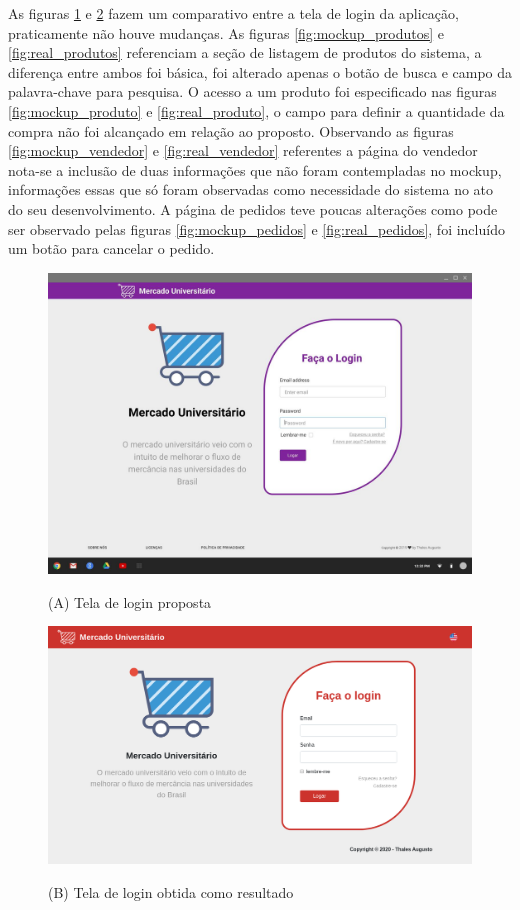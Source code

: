 As figuras \ref{fig:mockup_login} e \ref{fig:real_login} fazem um comparativo entre a tela de login da aplicação, praticamente não houve mudanças. As figuras \ref{fig:mockup_produtos} e \ref{fig:real_produtos} referenciam a seção de listagem de produtos do sistema, a diferença entre ambos foi básica, foi alterado apenas o botão de busca e campo da palavra-chave para pesquisa. O acesso a um produto foi especificado nas figuras \ref{fig:mockup_produto} e \ref{fig:real_produto}, o campo para definir a quantidade da compra não foi alcançado em relação ao proposto. Observando as figuras \ref{fig:mockup_vendedor} e \ref{fig:real_vendedor} referentes a página do vendedor nota-se a inclusão de duas informações que não foram contempladas no mockup, informações essas que só foram observadas como necessidade do sistema no ato do seu desenvolvimento. A página de pedidos teve poucas alterações como pode ser observado pelas figuras \ref{fig:mockup_pedidos} e \ref{fig:real_pedidos}, foi incluído um botão para cancelar o pedido.

\begin{figure}[htbp!]
  \centering
  \caption{(A) Tela de login proposta}
  \includegraphics[width=1\textwidth]{figs/mockup/login.jpg}
    \label{fig:mockup_login}
\end{figure}

\begin{figure}[htbp!]
  \centering
  \caption{(B) Tela de login obtida como resultado}
  \includegraphics[width=1\textwidth]{figs/resultado/login.png}
    \label{fig:real_login}
\end{figure}

